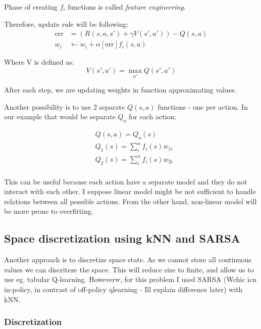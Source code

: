 \documentclass[12pt]{article}
\begin{document}
Phase of creating $f_i$ functions is called \emph{feature engineering}.

Therefore, update rule will be following:
\begin{equation}
\begin{aligned}
\text{err}&=(R(s,a,s')+\gamma V(s',a'))-Q(s,a) \\
w_i &\leftarrow w_i+\alpha [\text{err}] f_i (s,a)
\end{aligned}
\end{equation}

Where V is defined as:
\begin{equation}
V(s',a' )=\max_{a'}Q(s',a')
\end{equation}

After each step, we are updating weights in function approximating values.

Another possibility is to use 2 separate $Q(s,a)$ functions - one per action. In our example that would be separate $Q_a$ for each action:

\begin{equation}
\begin{aligned}
&Q(s, a) = Q_a(s) \\
&Q_1(s) = \sum_i^n f_i(s)w_{1i} \\
&Q_2(s) = \sum_i^n f_i(s)w_{2i} \\
\end{aligned}
\end{equation}

This can be useful because each action have a separate model and they do not interact with each other. I suppose linear model might be not sufficient to handle relations between all possible actions. From the other hand, non-linear model will be more prone to overfitting. 

\subsection{Space discretization using kNN and SARSA}
Another approach is to discretize space state. As we cannot store all continuous values we can discriteze the space. This will reduce size to finite, and allow us to use eg. tabular Q-learning. Howeverw, for this problem I used SARSA (Wchic icn in-policy, in contrast of off-policy qlearning - Ill explain difference later) with kNN.

\subsubsection{Discretization}
\end{document}
